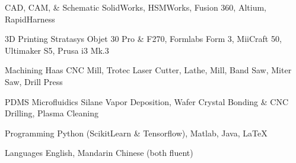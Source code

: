 


\begin{cvskills}


\cvskill
{CAD, CAM, \& Schematic} %
{SolidWorks, HSMWorks, Fusion 360, Altium, RapidHarness} %


\cvskill
{3D Printing} %
{Stratasys Objet 30 Pro \& F270, Formlabs Form 3, MiiCraft 50, Ultimaker S5, Prusa i3 Mk.3} %

\cvskill
{Machining}
{Haas CNC Mill, Trotec Laser Cutter, Lathe, Mill, Band Saw, Miter Saw, Drill Press}

\cvskill
{PDMS Microfluidics}
{Silane Vapor Deposition, Wafer Crystal Bonding \& CNC Drilling, Plasma Cleaning}

\cvskill
{Programming} %
{Python (ScikitLearn \& Tensorflow), Matlab, Java, LaTeX} %

\cvskill
{Languages}
{English, Mandarin Chinese (both fluent)}


\end{cvskills}